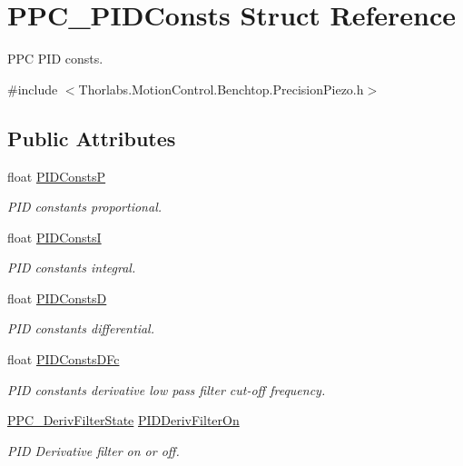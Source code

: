 \hypertarget{struct_p_p_c___p_i_d_consts}{}\section{P\+P\+C\+\_\+\+P\+I\+D\+Consts Struct Reference}
\label{struct_p_p_c___p_i_d_consts}


P\+PC P\+ID consts.  




{\ttfamily \#include $<$Thorlabs.\+Motion\+Control.\+Benchtop.\+Precision\+Piezo.\+h$>$}

\subsection*{Public Attributes}
\begin{DoxyCompactItemize}
\item 
float \hyperlink{struct_p_p_c___p_i_d_consts_a167bc117b598c86d31b7479e918e66ba}{P\+I\+D\+ConstsP}
\begin{DoxyCompactList}\small\item\em P\+ID constants proportional. \end{DoxyCompactList}\item 
float \hyperlink{struct_p_p_c___p_i_d_consts_a1199abcba65cf5d00e46ed04136aa9e1}{P\+I\+D\+ConstsI}
\begin{DoxyCompactList}\small\item\em P\+ID constants integral. \end{DoxyCompactList}\item 
float \hyperlink{struct_p_p_c___p_i_d_consts_ad7f11dc1aa9ff8cf4896582f40c511d9}{P\+I\+D\+ConstsD}
\begin{DoxyCompactList}\small\item\em P\+ID constants differential. \end{DoxyCompactList}\item 
float \hyperlink{struct_p_p_c___p_i_d_consts_a33979ab0b95fb03f9c0571b8dea80218}{P\+I\+D\+Consts\+D\+Fc}
\begin{DoxyCompactList}\small\item\em P\+ID constants derivative low pass filter cut-\/off frequency. \end{DoxyCompactList}\item 
\hyperlink{group___benchtop_precision_piezo_ga59c677623dc0d8e960f123455ba8c864}{P\+P\+C\+\_\+\+Deriv\+Filter\+State} \hyperlink{struct_p_p_c___p_i_d_consts_aad9f651e289da93ed9d4dc1698c3fa66}{P\+I\+D\+Deriv\+Filter\+On}
\begin{DoxyCompactList}\small\item\em P\+ID Derivative filter on or off. \end{DoxyCompactList}\end{DoxyCompactItemize}


